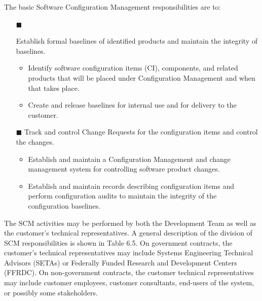 \documentclass[10pt,twocolumn]{article}
\begin{document}
The basic Software Configuration Management responsibilities are to:
\begin{itemize}
	\item [$\blacksquare$]

Establish formal baselines of identified products and
maintain the integrity of baselines.
\begin{itemize}
\item
 Identify software configuration items (CI), components, and related products that will be placed
under Configuration Management and when that
takes place.
\item
Create and release baselines for internal use and for
delivery to the customer.
\end{itemize}
\item [$\blacksquare$]
Track and control Change Requests for the configuration items and control the changes.
\begin{itemize}
\item
Establish and maintain a Configuration
Management and change management system for
controlling software product changes.
\item
 Establish and maintain records describing configuration items and perform configuration audits
to maintain the integrity of the configuration
baselines.
\end{itemize}
\end{itemize}
The SCM activities may be performed by both the
Development Team as well as the customer’s technical representatives. A general description of the division of SCM
responsibilities is shown in Table 6.5. On government
contracts, the customer’s technical representatives may
include Systems Engineering Technical Advisors (SETAs)
or Federally Funded Research and Development Centers
(FFRDC). On non-government contracts, the customer
technical representatives may include customer employees,
customer consultants, end-users of the system, or possibly
some stakeholders.
\end{document}
